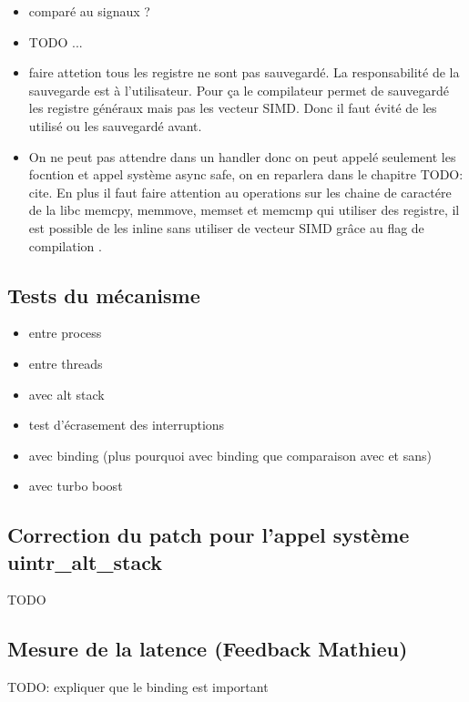 \begin{itemize}
  \item comparé au signaux ?
  \item TODO ...
  \item faire attetion tous les registre ne sont pas sauvegardé. La responsabilité de la sauvegarde est à l'utilisateur. Pour ça le compilateur permet de sauvegardé les registre généraux mais pas les vecteur SIMD. Donc il faut évité de les utilisé ou les sauvegardé avant.
  \item On ne peut pas attendre dans un handler donc on peut appelé seulement les focntion et appel système async safe, on en reparlera dans le chapitre TODO: cite. En plus il faut faire attention au operations sur les chaine de caractére de la libc memcpy, memmove, memset et memcmp qui utiliser des registre, il est possible de les inline sans utiliser de vecteur SIMD grâce au flag de compilation .
\end{itemize}

\subsection{Tests du mécanisme}


\begin{itemize}
  \item entre process
  \item entre threads
  \item avec alt stack
  \item test d'écrasement des interruptions
  \item avec binding (plus pourquoi avec binding que comparaison avec et sans)
  \item avec turbo boost
\end{itemize}

\subsection{Correction du patch pour l'appel système uintr_alt_stack}

TODO

\subsection{Mesure de la latence (Feedback Mathieu)}

TODO: expliquer que le binding est important

